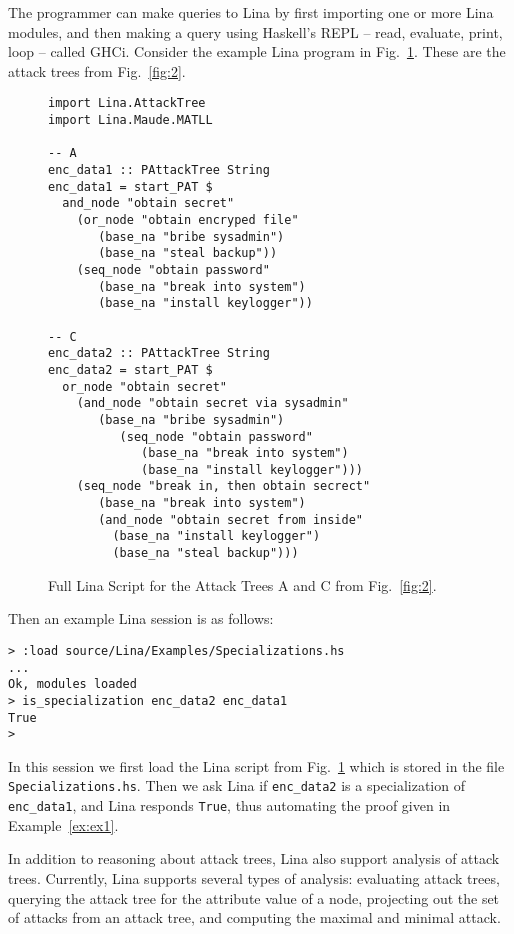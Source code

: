 The programmer can make queries to Lina by first importing one or more
Lina modules, and then making a query using Haskell's REPL -- read,
evaluate, print, loop -- called GHCi.  Consider the example Lina
program in Fig.~\ref{fig:lina-script-encrypt}. These are the attack
trees from Fig.~\ref{fig:2}.
\begin{figure}
  \begin{mdframed}
\begin{verbatim}
import Lina.AttackTree
import Lina.Maude.MATLL

-- A
enc_data1 :: PAttackTree String
enc_data1 = start_PAT $
  and_node "obtain secret"
    (or_node "obtain encryped file"
       (base_na "bribe sysadmin")
       (base_na "steal backup"))
    (seq_node "obtain password"
       (base_na "break into system")
       (base_na "install keylogger"))

-- C
enc_data2 :: PAttackTree String
enc_data2 = start_PAT $
  or_node "obtain secret"
    (and_node "obtain secret via sysadmin"
       (base_na "bribe sysadmin")
          (seq_node "obtain password"
             (base_na "break into system")
             (base_na "install keylogger")))
    (seq_node "break in, then obtain secrect"
       (base_na "break into system")
       (and_node "obtain secret from inside"
         (base_na "install keylogger")
         (base_na "steal backup")))
    \end{verbatim}
  \end{mdframed}
  \caption{Full Lina Script for the Attack Trees A and C from Fig.~\ref{fig:2}.}
  \label{fig:lina-script-encrypt}
\end{figure}
Then an example Lina session is as follows:
\begin{mdframed}\scriptsize
  \begin{verbatim}
> :load source/Lina/Examples/Specializations.hs
...
Ok, modules loaded
> is_specialization enc_data2 enc_data1
True
>     
  \end{verbatim}
\end{mdframed}
In this session we first load the Lina script from
Fig.~\ref{fig:lina-script-encrypt} which is stored in the file
\verb!Specializations.hs!.  Then we ask Lina if \verb!enc_data2! is a
specialization of \verb!enc_data1!, and Lina responds \verb!True!,
thus automating the proof given in Example~\ref{ex:ex1}.

In addition to reasoning about attack trees, Lina also support
analysis of attack trees.  Currently, Lina supports several types of
analysis: evaluating attack trees, querying the attack tree for the
attribute value of a node, projecting out the set of attacks from an
attack tree, and computing the maximal and minimal attack.

